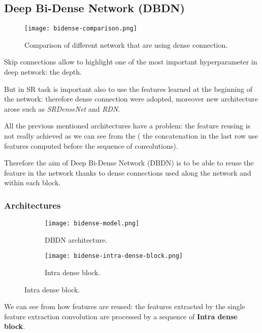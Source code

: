 \subsection{Deep Bi-Dense Network (DBDN\cite{DBDN})}
\begin{figure}
    \centering
    \texttt{[image: bidense-comparison.png]}
    \caption{Comparison of different network that are using dense connection.}\label{dbdn:comparison}
\end{figure}

Skip connections allow to highlight one of the most important hyperparameter in deep network: the depth.

But in SR task is important also to use the features learned at the beginning of the network: therefore dense connection were adopted, moreover new architecture arose such as \textit{SRDenseNet} and \textit{RDN}.

All the previous mentioned architectures have a problem: the feature reusing is not really achieved as we can see from the  ( the concatenation in the last row use features computed before the sequence of convolutions).

Therefore the aim of Deep Bi-Dense Network (DBDN) is to be able to reuse the feature in the network thanks to dense connections used along the network and within each block.

\subsubsection{Architectures}
\begin{figure}
    \begin{subfigure}{\textwidth}
        \centering
        \texttt{[image: bidense-model.png]}
        \caption{DBDN architecture.}\label{dbdn:architecture}            
    \end{subfigure}
    \begin{subfigure}{\textwidth}
        \centering
        \texttt{[image: bidense-intra-dense-block.png]}
        \caption{Intra dense block.}\label{dbdn:idb}   
    \end{subfigure}


\end{figure}

We can see from  how features are reused: the features extracted by the single feature extraction convolution are processed by a sequence of \textbf{Intra dense block}.

